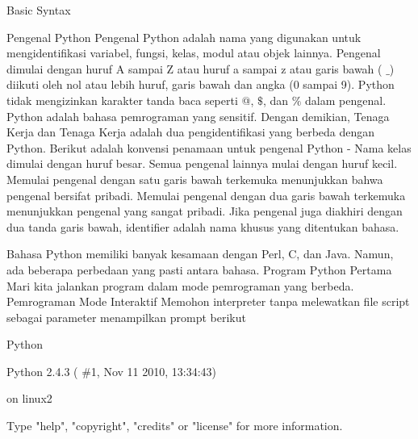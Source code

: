 
\sloppy
{\fontsize{14pt}{14pt}\selectfont \vspace{\baselineskip}
Basic Syntax \\} \par
\vspace{14pt}
\noindent 
{\fontsize{14pt}{14pt}\selectfont Pengenal Python Pengenal Python adalah nama yang digunakan untuk mengidentifikasi variabel, fungsi, kelas, modul atau objek lainnya. Pengenal dimulai dengan huruf A sampai Z atau huruf a sampai z atau garis bawah ( $  \_  $) diikuti oleh nol atau lebih huruf, garis bawah dan angka (0 sampai 9). Python tidak mengizinkan karakter tanda baca seperti @,  $  \$  $, dan $  \%  $ dalam pengenal. Python adalah bahasa pemrograman yang sensitif. Dengan demikian, Tenaga Kerja dan Tenaga Kerja adalah dua pengidentifikasi yang berbeda dengan Python. Berikut adalah konvensi penamaan untuk pengenal Python - Nama kelas dimulai dengan huruf besar. Semua pengenal lainnya mulai dengan huruf kecil. Memulai pengenal dengan satu garis bawah terkemuka menunjukkan bahwa pengenal bersifat pribadi. Memulai pengenal dengan dua garis bawah terkemuka menunjukkan pengenal yang sangat pribadi. Jika pengenal juga diakhiri dengan dua tanda garis bawah, identifier adalah nama khusus yang ditentukan bahasa. \\} \par
\vspace{14pt}
\noindent 
{\fontsize{14pt}{14pt}\selectfont \vspace{\baselineskip}
Bahasa Python memiliki banyak kesamaan dengan Perl, C, dan Java. Namun, ada beberapa perbedaan yang pasti antara bahasa. Program Python Pertama Mari kita jalankan program dalam mode pemrograman yang berbeda. Pemrograman Mode Interaktif Memohon interpreter tanpa melewatkan file script sebagai parameter menampilkan prompt berikut  \\} \par
\vspace{14pt}
\noindent 
{\fontsize{14pt}{14pt}\selectfont Python \\} \par
\vspace{14pt}
\noindent 
{\fontsize{14pt}{14pt}\selectfont Python 2.4.3 ( $  \#  $1, Nov 11 2010, 13:34:43) \\} \par
\noindent 
{\fontsize{14pt}{14pt} on linux2 \\} \par
\noindent 
{\fontsize{14pt}{14pt}\selectfont Type "help", "copyright", "credits" or "license" for more information. \\} \par
